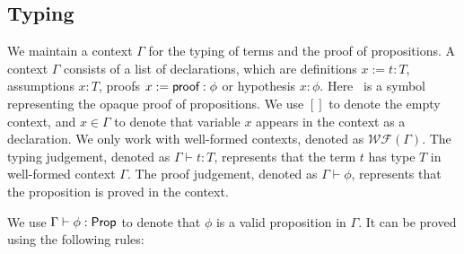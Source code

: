 \subsection{Typing}

\newcommand{\WF}[1]{\ensuremath{\mathcal{WF}(#1)}}

We maintain a context $\Gamma$ for the typing of terms and the proof of propositions. 
A context $\Gamma$ consists of a list of declarations, which are definitions $x := t : T$, assumptions $x : T$, proofs $x := \textsf{proof} : \phi$ or hypothesis $x : \phi$. 
Here \pf\ is a symbol representing the opaque proof of propositions.
We use $[]$ to denote the empty context, and $x \in \Gamma$ to denote that variable $x$ appears in the context as a declaration.
We only work with well-formed contexts, denoted as \WF{\Gamma}. 
The typing judgement, denoted as $\Gamma \vdash t : T$, represents that the term $t$ has type $T$ in well-formed context $\Gamma$. 
The proof judgement, denoted as $\Gamma \vdash \phi$, represents that the proposition is proved in the context.

We use $\Gamma \vdash \phi : \textsf{Prop}$ to denote that $\phi$ is a valid proposition in $\Gamma$. It can be proved using the following rules:


